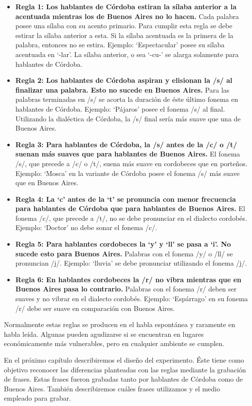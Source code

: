 \begin{itemize}

\item \textbf{Regla 1: Los hablantes de Córdoba estiran la sílaba anterior a la acentuada mientras los de Buenos Aires no lo hacen.} Cada palabra posee una sílaba con su acento primario. Para cumplir esta regla se debe estirar la sílaba anterior a esta. Si la sílaba acentuada es la primera de la palabra, entonces no se estira. Ejemplo: `Espectacular' posee su sílaba acentuada en `-lar'. La sílaba anterior, o sea `-cu-' se alarga solamente para hablantes de Córdoba. 

\item \textbf{Regla 2: Los hablantes de Córdoba aspiran y elisionan la /s/ al finalizar una palabra. Esto no sucede en Buenos Aires.} Para las palabras terminadas en /s/ se acorta la duración de éste último fonema en hablantes de Córdoba. Ejemplo: `Pájaros' posee el fonema /s/ al final. Utilizando la dialéctica de Córdoba, la /s/ final sería más suave que una de Buenos Aires. 

\item \textbf{Regla 3: Para hablantes de Córdoba, la /s/ antes de la /c/ o /t/ suenan más suaves que para hablantes de Buenos Aires.} El fonema /s/, que precede a /c/ o /t/, suena más suave en cordobeces que en porteños. Ejemplo: `Mosca' en la variante de Córdoba posee el fonema /s/ más suave que en Buenos Aires.

\item \textbf{Regla 4: La `c' antes de la `t' se pronuncia con menor frecuencia para hablantes de Córdoba que para hablantes de Buenos Aires.} El fonema /c/, que precede a /t/, no se debe pronunciar en el dialecto cordobés. Ejemplo: `Doctor' no debe sonar el fonema /c/.

\item \textbf{Regla 5: Para hablantes cordobeces la `y’ y `ll’ se pasa a `i’. No sucede esto para Buenos Aires.} Palabras con el fonema /y/ o /ll/ se pronuncian /j/. Ejemplo: `lluvia' se debe pronunciar utilizando el fonema /j/. 

\item \textbf{Regla 6: En hablantes cordobeces la /r/ no vibra mientras que en Buenos Aires pasa lo contrario.} Palabras con el fonema /r/ deben ser suaves y no vibrar en el dialecto cordobés. Ejemplo: `Espárrago' en su fonema /r/ debe ser suave en comparación con Buenos Aires. 

\end{itemize}

Normalmente estas reglas se producen en el habla espontánea y raramente en habla leída. Algunas pueden agudizarse si se encuentran en lugares económicamente más vulnerables, pero en cualquier ambiente se cumplen.

En el próximo capítulo describiremos el diseño del experimento. Éste tiene como objetivo reconocer las diferencias planteadas con las reglas mediante la grabación de frases. Estas frases fueron grabadas tanto por hablantes de Córdoba como de Buenos Aires. También describiremos cuáles frases utilizamos y el medio empleado para grabar.
